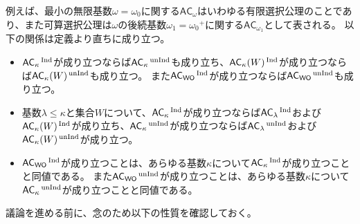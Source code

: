 \documentclass{jarticle}
\newcommand{\WithIndex}[1]{$\textrm{#1}{}^{\,\textrm{\scriptsize Ind}}$}
\newcommand{\WithoutIndex}[1]{$\textrm{#1}{}^{\,\textrm{\scriptsize unInd}}$}
\begin{document}
例えば、最小の無限基数$\omega = \omega_0$に関する$\mathsf{AC}_{\omega}$はいわゆる有限選択公理のことであり、また可算選択公理は$\omega$の後続基数$\omega_1 = \omega_0{}^{+}$に関する$\mathsf{AC}_{\omega_1}$として表される。
以下の関係は定義より直ちに成り立つ。
\begin{itemize}
\item
\WithIndex{$\mathsf{AC}_{\kappa}$}が成り立つならば\WithoutIndex{$\mathsf{AC}_{\kappa}$}も成り立ち、\WithIndex{$\mathsf{AC}_{\kappa}(W)$}が成り立つならば\WithoutIndex{$\mathsf{AC}_{\kappa}(W)$}も成り立つ。
また\WithIndex{$\mathsf{AC}_{\mathsf{WO}}$}が成り立つならば\WithoutIndex{$\mathsf{AC}_{\mathsf{WO}}$}も成り立つ。
\item
基数$\lambda \leq \kappa$と集合$W$について、\WithIndex{$\mathsf{AC}_{\kappa}$}が成り立つならば\WithIndex{$\mathsf{AC}_{\lambda}$}および\WithIndex{$\mathsf{AC}_{\kappa}(W)$}が成り立ち、\WithoutIndex{$\mathsf{AC}_{\kappa}$}が成り立つならば\WithoutIndex{$\mathsf{AC}_{\lambda}$}および\WithoutIndex{$\mathsf{AC}_{\kappa}(W)$}が成り立つ。
\item
\WithIndex{$\mathsf{AC}_{\mathsf{WO}}$}が成り立つことは、あらゆる基数$\kappa$について\WithIndex{$\mathsf{AC}_{\kappa}$}が成り立つことと同値である。
また\WithoutIndex{$\mathsf{AC}_{\mathsf{WO}}$}が成り立つことは、あらゆる基数$\kappa$について\WithoutIndex{$\mathsf{AC}_{\kappa}$}が成り立つことと同値である。
\end{itemize}
議論を進める前に、念のため以下の性質を確認しておく。
\end{document}
